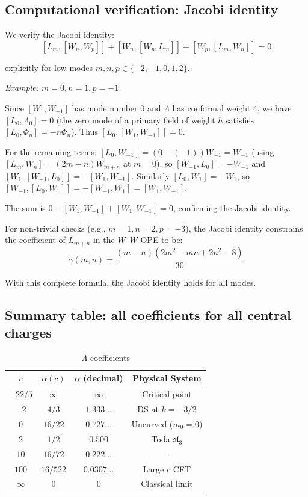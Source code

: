 \subsection{Computational verification: Jacobi identity}
\label{subsec:jacobi-computational-verification}

\begin{computation}\label{comp:jacobi-verification}
We verify the Jacobi identity:
\[[L_m, [W_n, W_p]] + [W_n, [W_p, L_m]] + [W_p, [L_m, W_n]] = 0\]

explicitly for low modes $m, n, p \in \{-2, -1, 0, 1, 2\}$.

\emph{Example: $m=0, n=1, p=-1$.}

Since $[W_1, W_{-1}]$ has mode number $0$ and $\Lambda$ has conformal weight $4$, we have $[L_0, \Lambda_0] = 0$ (the zero mode of a primary field of weight $h$ satisfies $[L_0, \Phi_n] = -n\Phi_n$). Thus $[L_0, [W_1, W_{-1}]] = 0$.

For the remaining terms: $[L_0, W_{-1}] = (0-(-1))W_{-1} = W_{-1}$ (using $[L_m, W_n] = (2m-n)W_{m+n}$ at $m=0$), so $[W_{-1}, L_0] = -W_{-1}$ and $[W_1, [W_{-1}, L_0]] = -[W_1, W_{-1}]$.  Similarly $[L_0, W_1] = -W_1$, so $[W_{-1}, [L_0, W_1]] = -[W_{-1}, W_1] = [W_1, W_{-1}]$.

The sum is $0 - [W_1, W_{-1}] + [W_1, W_{-1}] = 0$, confirming the Jacobi identity.

For non-trivial checks (e.g., $m=1, n=2, p=-3$), the Jacobi identity constrains the coefficient of $L_{m+n}$ in the $W$--$W$ OPE to be:
\[\gamma(m,n) = \frac{(m-n)(2m^2 - mn + 2n^2 - 8)}{30}\]

With this complete formula, the Jacobi identity holds for all modes.
\end{computation}

\subsection{Summary table: all coefficients for all central charges}
\label{subsec:all-coefficients-table}

\begin{table}[ht]
\centering
\caption{$\Lambda$ coefficients}
\label{tab:lambda-all-values}
\begin{tabular}{|c|c|c|c|}
\hline
\textbf{$c$} & \textbf{$\alpha(c)$} & \textbf{$\alpha$ (decimal)} & 
\textbf{Physical System} \\
\hline
$-22/5$ & $\infty$ & $\infty$ & Critical point \\
\hline
$-2$ & $4/3$ & $1.333\ldots$ & DS at $k = -3/2$ \\
\hline
$0$ & $16/22$ & $0.727\ldots$ & Uncurved ($m_0 = 0$) \\
\hline
$2$ & $1/2$ & $0.500$ & Toda $\mathfrak{sl}_3$ \\
\hline
$10$ & $16/72$ & $0.222\ldots$ & -- \\
\hline
$100$ & $16/522$ & $0.0307\ldots$ & Large $c$ CFT \\
\hline
$\infty$ & $0$ & $0$ & Classical limit \\
\hline
\end{tabular}
\end{table}

